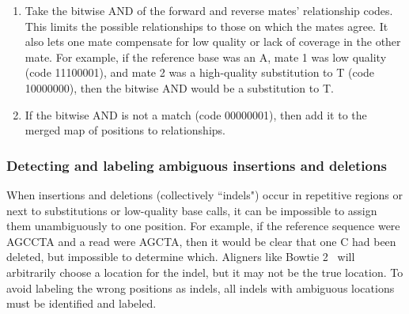 \documentclass{article}
\begin{document}
\begin{enumerate}
\begin{enumerate}
        \item Take the bitwise AND of the forward and reverse mates' relationship codes. This limits the possible relationships to those on which the mates agree. It also lets one mate compensate for low quality or lack of coverage in the other mate. For example, if the reference base was an A, mate 1 was low quality (code 11100001), and mate 2 was a high-quality substitution to T (code 10000000), then the bitwise AND would be a substitution to T.
        \item If the bitwise AND is not a match (code 00000001), then add it to the merged map of positions to relationships.
    \end{enumerate}
\end{enumerate}


\subsubsection{Detecting and labeling ambiguous insertions and deletions}
\label{ambiguous-indels}

When insertions and deletions (collectively ``indels") occur in repetitive regions or next to substitutions or low-quality base calls, it can be impossible to assign them unambiguously to one position.
For example, if the reference sequence were AGCCTA and a read were AGCTA, then it would be clear that one C had been deleted, but impossible to determine which.
Aligners like Bowtie 2~\cite{Langmead2012} will arbitrarily choose a location for the indel, but it may not be the true location.
To avoid labeling the wrong positions as indels, all indels with ambiguous locations must be identified and labeled.
\end{document}
